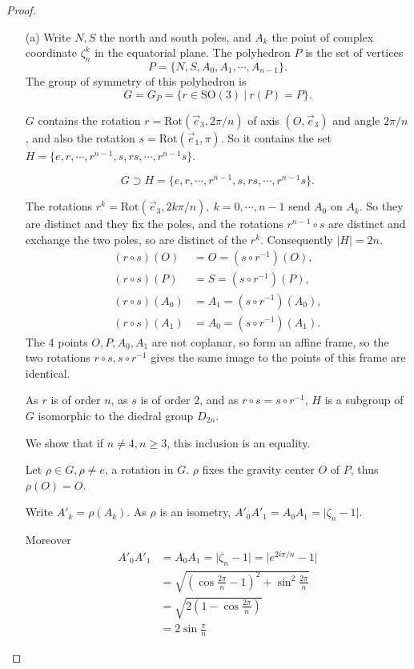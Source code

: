 \documentclass[11pt,a4paper]{article}
\begin{document}
\begin{proof}
\begin{enumerate}
\item[(a)]
Write $N,S$ the north and south poles, and $A_k$ the point of complex coordinate $\zeta_n^k$ in the equatorial plane. The polyhedron $P$ is the set of vertices
$$P = \{N,S,A_0,A_1,\cdots,A_{n-1}\}.$$
The group of symmetry of this polyhedron is 
$$G = G_P = \{ r \in \mathrm{SO}(3) \ \vert \ r(P) = P \}.$$

$G$ contains the rotation  $r = \mathrm{Rot}(\vec{e}_3,  2\pi/n)$ of axis $(O,\vec{e}_3)$ and angle $ 2\pi/n$, and also the rotation $s = \mathrm{Rot}(\vec{e}_1, \pi)$. So it contains the set $H = \{e,r,\cdots,r^{n-1}, s, rs,\cdots, r^{n-1}s\}$.

$$G \supset H = \{e,r,\cdots,r^{n-1}, s, rs,\cdots, r^{n-1}s\}.$$

The rotations $r^k = \mathrm{Rot}(\vec{e}_3,  2k\pi/n),\ k=0,\cdots,n-1$ send $A_0$ on $A_k$. So they are distinct  and they fix the poles, and the rotations $r^{n-1} \circ s$ are distinct and exchange the two poles, so are distinct of the $r^k$. Consequently $\vert H \vert = 2n$.
\begin{align*}
(r\circ s)(O) &= O = (s\circ r^{-1})(O), \\
(r \circ s)(P) &= S = (s\circ r^{-1})(P),\\
 (r\circ s)(A_0)&=A_1 = (s\circ r^{-1})(A_0),\\
 (r \circ s)(A_1) &= A_0 = (s\circ r^{-1})(A_1).
 \end{align*}
The 4 points $O,P,A_0,A_1$ are not coplanar, so form an affine frame, so the two rotations $r \circ s, s \circ r^{-1}$ gives the same image to the points of this frame are identical.

As $r$ is of order $n$, as $s$ is of order 2, and as $r\circ s=s\circ r^{-1}$, $H$ is a subgroup of $G$ isomorphic to the diedral group $D_{2n}$.

We show that if $n\neq 4, n\geq 3$, this inclusion is an equality.

Let $\rho \in G, \rho \neq e$, a rotation in $G$. $\rho$ fixes the gravity center $O$ of $P$, thus $\rho(O) = O$.

Write $A'_k = \rho(A_k)$.
As $\rho$ is an isometry, $A'_0 A'_1 = A_0A_1 = \vert \zeta_n-1 \vert$.


Moreover 
\begin{align*}
A'_0 A'_1 &= A_0A_1 = \vert \zeta_n-1 \vert =\vert e^{2i\pi/n} -1 \vert\\
&= \sqrt{\left(\cos \frac{2\pi}{n} - 1\right)^2 + \sin^2  \frac{2\pi}{n}}\\
&= \sqrt{2\left(1-\cos  \frac{2\pi}{n}\right)}\\
&=2 \sin  \frac{\pi}{n}
\end{align*}


\end{enumerate}
\end{proof}
\end{document}
